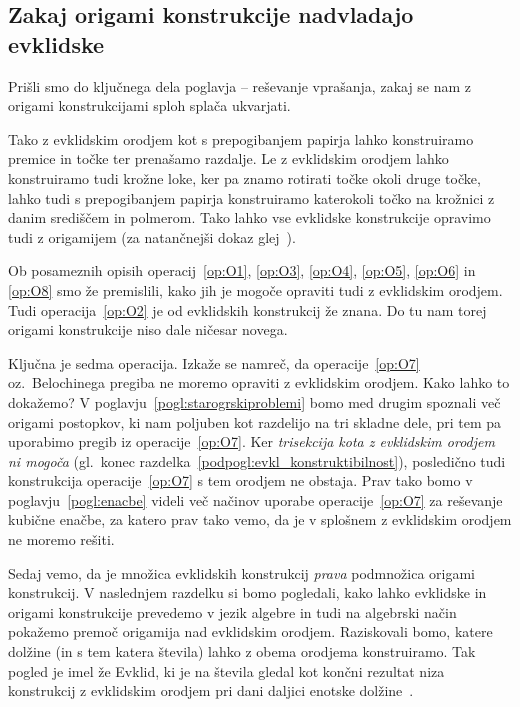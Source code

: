 \subsection{Zakaj origami konstrukcije nadvladajo evklidske}
\label{podpogl:nadvlada_origamija}

Prišli smo do ključnega dela poglavja -- reševanje vprašanja, zakaj se nam z origami konstrukcijami sploh splača ukvarjati.

Tako z evklidskim orodjem kot s prepogibanjem papirja lahko konstruiramo premice in točke ter prenašamo razdalje. Le z evklidskim orodjem lahko konstruiramo tudi krožne loke, ker pa znamo rotirati točke okoli druge točke, lahko tudi s prepogibanjem papirja konstruiramo katerokoli točko na krožnici z danim središčem in polmerom. Tako lahko vse evklidske konstrukcije opravimo tudi z origamijem (za natančnejši dokaz glej~\cite[str.\ 362--365]{geret1995}).

Ob posameznih opisih operacij~\ref{op:O1}, \ref{op:O3}, \ref{op:O4}, \ref{op:O5}, \ref{op:O6} in \ref{op:O8} smo že premislili, kako  jih je mogoče opraviti tudi z evklidskim orodjem. Tudi operacija~\ref{op:O2} je od evklidskih konstrukcij že znana. Do tu nam torej origami konstrukcije niso dale ničesar novega.

Ključna je sedma operacija. Izkaže se namreč, da operacije~\ref{op:O7} oz.\ Belochinega pregiba ne moremo opraviti z evklidskim orodjem. Kako lahko to dokažemo? V poglavju~\ref{pogl:starogrskiproblemi} bomo med drugim spoznali več origami postopkov, ki nam poljuben kot razdelijo na tri skladne dele, pri tem pa uporabimo pregib iz operacije~\ref{op:O7}. Ker \emph{trisekcija kota z evklidskim orodjem ni mogoča} (gl.\ konec razdelka~\ref{podpogl:evkl_konstruktibilnost}), posledično tudi konstrukcija operacije~\ref{op:O7} s tem orodjem ne obstaja. Prav tako bomo v poglavju~\ref{pogl:enacbe} videli več načinov uporabe operacije~\ref{op:O7} za reševanje kubične enačbe, za katero prav tako vemo, da je v splošnem z evklidskim orodjem ne moremo rešiti.

Sedaj vemo, da je množica evklidskih konstrukcij \emph{prava} podmnožica origami konstrukcij. V naslednjem razdelku si bomo pogledali, kako lahko evklidske in origami konstrukcije prevedemo v jezik algebre in tudi na algebrski način pokažemo premoč origamija nad evklidskim orodjem. Raziskovali bomo, katere dolžine (in s tem katera števila) lahko z obema orodjema konstruiramo. Tak pogled je imel že Evklid, ki je na števila gledal kot končni rezultat niza konstrukcij z evklidskim orodjem pri dani daljici enotske dolžine~\cite[str. 164]{michael2005}.

